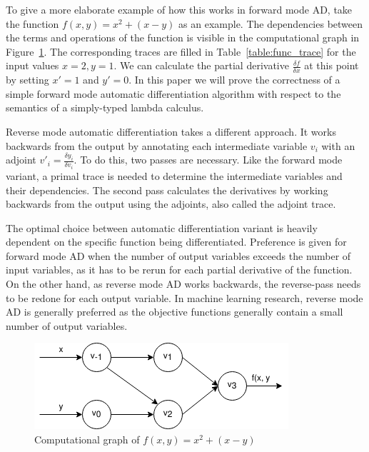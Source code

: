 To give a more elaborate example of how this works in forward mode AD, take the function $f(x, y) = x^2 + (x - y)$ as an example.
The dependencies between the terms and operations of the function is visible in the computational graph in Figure~\ref{fig:func_trace}.
The corresponding traces are filled in Table~\ref{table:func_trace} for the input values $x = 2, y = 1$.
We can calculate the partial derivative $\frac{\delta f}{\delta x}$ at this point by setting $x' = 1$ and $y' = 0$.
In this paper we will prove the correctness of a simple forward mode automatic differentiation algorithm with respect to the semantics of a simply-typed lambda calculus.

Reverse mode automatic differentiation takes a different approach.
It works backwards from the output by annotating each intermediate variable $v_i$ with an adjoint $v'_i=\frac{\delta y_i}{\delta v_i}$.
To do this, two passes are necessary.
Like the forward mode variant, a primal trace is needed to determine the intermediate variables and their dependencies.
The second pass calculates the derivatives by working backwards from the output using the adjoints, also called the adjoint trace.

The optimal choice between automatic differentiation variant is heavily dependent on the specific function being differentiated.
Preference is given for forward mode AD when the number of output variables exceeds the number of input variables, as it has to be rerun for each partial derivative of the function.
On the other hand, as reverse mode AD works backwards, the reverse-pass needs to be redone for each output variable.
In machine learning research, reverse mode AD is generally preferred as the objective functions generally contain a small number of output variables.


\begin{figure}
  \centering
  \includegraphics[scale=0.6]{./assets/function_trace.png}
  \caption{Computational graph of $f(x, y) = x^2 + (x - y)$}
  \label{fig:func_trace}
\end{figure}

